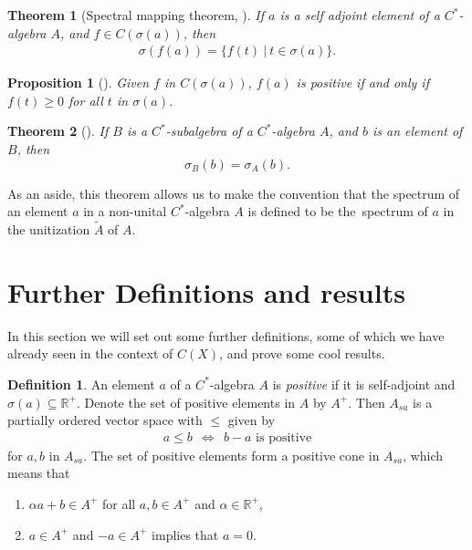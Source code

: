 \documentclass[12pt,a4paper]{report}
\theoremstyle{plain}
\newtheorem*{thm*}{Theorem}
\newtheorem{prop}{Proposition}
\theoremstyle{definition}
\newtheorem{defn}{Definition}
\newcommand{\1}{\mathbbm{1}}
\newcommand{\R}{\mathbb{R}}
\newcommand{\CX}{C(X)}
\newcommand{\spec}[1]{\sigma(#1)}
\begin{document}
\begin{thm*}[Spectral mapping theorem, {\cite[4.1.6]{kadison83}}]
	If $a$ is a self adjoint element of a $C^\ast$-algebra $A$, and $f\in C(\spec a)$, then
	\begin{align*}
		\spec{f(a)} = \{f(t) ~|~ t \in \spec a\}.
	\end{align*}
\end{thm*}

\begin{prop}[{\cite[4.2.3(i)]{kadison83}}]\label{prop:423}
	Given $f$ in $C(\spec a)$, $f(a)$ is positive if and only if $f(t)\geq0$ for all $t$ in $\spec a$.
\end{prop}

\begin{thm*}[{\cite[4.1.5]{kadison83}}]
	If $B$ is a $C^\ast$-subalgebra of a $C^\ast$-algebra $A$, and $b$ is an element of $B$, then 
	\[
		\sigma_B(b) =\sigma_A(b).
	\]
\end{thm*}


As an aside, this theorem allows us to make the convention that the spectrum of an element $a$ in a 
non-unital $C^\ast$-algebra $A$ is defined to be the~spectrum of $a$ in the unitization $\tilde A$ 
of $A$.




\section{Further Definitions and results}
In this section we will set out some further definitions, some of which we have already seen in the context of $\CX$, and prove some cool results.

\begin{defn}
	An element $a$ of a $C^\ast$-algebra $A$ is \emph{positive} if it is self-adjoint and $\spec a
	\subseteq \R^+$. 
	Denote the set of positive elements in $A$ by $A^+$. Then $A_{sa}$ is a partially ordered vector space 
	with $\leq$ given by 
	\begin{align*}
		a\leq b ~~\iff~~ b-a \mbox{ is positive}
	\end{align*}
	for $a,b$ in $A_{sa}$.
	The set of positive elements form a positive cone in $A_{sa}$, which means that 
	\begin{enumerate}
		\item 	$\alpha a+b\in A^+$ for all $a,b \in A^+$ and $\alpha\in \R^+$,
		\item	$a\in A^+$ and $-a\in A^+$ implies that $a=0$.
	\end{enumerate}
\end{defn}
\end{document}
